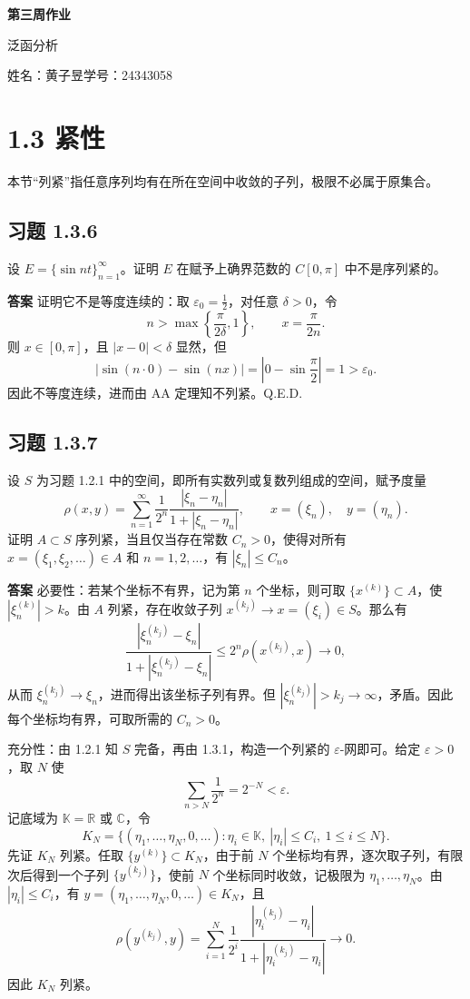 \documentclass[UTF8,a4paper,11pt,fontset=fandol]{ctexart}
\newcommand{\exercise}[1]{\par\ifdim\dimexpr\pagegoal-\pagetotal\relax<7\baselineskip\newpage\fi\subsection*{习题 #1}}
\newcommand{\answer}{\par\smallskip\noindent\textbf{答案}\quad}
\newcommand{\qedherecustom}{\unskip\hfill\mbox{\normalfont Q.E.D.}\par}
\begin{document}
\begin{center}
{\LARGE\bfseries 第三周作业}\par\medskip
{\large 泛函分析}\par\medskip
姓名：黄子昱\qquad 学号：24343058
\end{center}
\medskip


\section*{1.3 紧性}
\noindent 本节“列紧”指任意序列均有在所在空间中收敛的子列，极限不必属于原集合。

\exercise{1.3.6}
设 $E=\{\sin nt\}_{n=1}^{\infty}$。证明 $E$ 在赋予上确界范数的 $C[0,\pi]$ 中不是序列紧的。

\answer
证明它不是等度连续的：取 $\varepsilon_0=\frac12$，对任意 $\delta>0$，令
\[
n>\max\left\{\frac{\pi}{2\delta},1\right\},\qquad x=\frac{\pi}{2n}.
\]
则 $x\in[0,\pi]$，且 $|x-0|<\delta$ 显然，但
\[
|\sin(n\cdot0)-\sin(nx)|=\left|0-\sin\frac\pi2\right|=1>\varepsilon_0.
\]
因此不等度连续，进而由 AA 定理知不列紧。\qedherecustom

\exercise{1.3.7}
设 $S$ 为习题 1.2.1 中的空间，即所有实数列或复数列组成的空间，赋予度量
\[
\rho(x,y)=\sum_{n=1}^{\infty}\frac1{2^n}
\frac{|\xi_n-\eta_n|}{1+|\xi_n-\eta_n|},
\qquad x=(\xi_n),\quad y=(\eta_n).
\]
证明 $A\subset S$ 序列紧，当且仅当存在常数 $C_n>0$，使得对所有 $x=(\xi_1,\xi_2,\ldots)\in A$ 和 $n=1,2,\ldots$，有 $|\xi_n|\leq C_n$。

\answer
必要性：若某个坐标不有界，记为第 $n$ 个坐标，则可取 $\{x^{(k)}\}\subset A$，使 $|\xi_n^{(k)}|>k$。由 $A$ 列紧，存在收敛子列 $x^{(k_j)}\to x=(\xi_i)\in S$。那么有
\[
\frac{|\xi_n^{(k_j)}-\xi_n|}{1+|\xi_n^{(k_j)}-\xi_n|}
\leq 2^n\rho(x^{(k_j)},x)\longrightarrow0,
\]
从而 $\xi_n^{(k_j)}\to\xi_n$，进而得出该坐标子列有界。但 $|\xi_n^{(k_j)}|>k_j\to\infty$，矛盾。因此每个坐标均有界，可取所需的 $C_n>0$。

充分性：由 1.2.1 知 $S$ 完备，再由 1.3.1，构造一个列紧的 $\varepsilon$-网即可。给定 $\varepsilon>0$，取 $N$ 使
\[
\sum_{n>N}\frac1{2^n}=2^{-N}<\varepsilon.
\]
记底域为 $\mathbb K=\mathbb R$ 或 $\mathbb C$，令
\[
K_N=\{(\eta_1,\ldots,\eta_N,0,\ldots):
\eta_i\in\mathbb K,\ |\eta_i|\leq C_i,\ 1\leq i\leq N\}.
\]
先证 $K_N$ 列紧。任取 $\{y^{(k)}\}\subset K_N$，由于前 $N$ 个坐标均有界，逐次取子列，有限次后得到一个子列 $\{y^{(k_j)}\}$，使前 $N$ 个坐标同时收敛，记极限为 $\eta_1,\ldots,\eta_N$。由 $|\eta_i|\leq C_i$，有 $y=(\eta_1,\ldots,\eta_N,0,\ldots)\in K_N$，且
\[
\rho(y^{(k_j)},y)=\sum_{i=1}^N\frac1{2^i}
\frac{|\eta_i^{(k_j)}-\eta_i|}{1+|\eta_i^{(k_j)}-\eta_i|}
\longrightarrow0.
\]
因此 $K_N$ 列紧。
\end{document}
